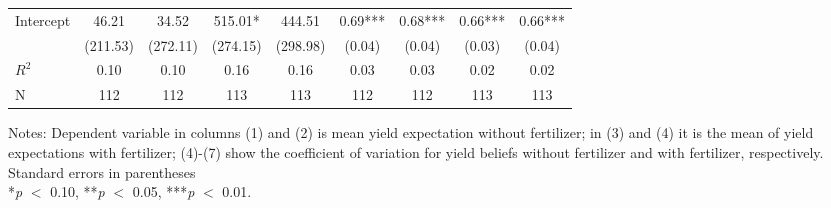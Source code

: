 \begin{table}[htbp]
\begin{threeparttable}
\begin{tabular}{l cccccccc}
Intercept           &       46.21   &       34.52   &      515.01*  &      444.51   &        0.69***&        0.68***&        0.66***&        0.66***\\
                    &    (211.53)   &    (272.11)   &    (274.15)   &    (298.98)   &      (0.04)   &      (0.04)   &      (0.03)   &      (0.04)   \\
\hline
$R^2$               &        0.10   &        0.10   &        0.16   &        0.16   &        0.03   &        0.03   &        0.02   &        0.02   \\
N                   &         112   &         112   &         113   &         113   &         112   &         112   &         113   &         113   \\
\hline
\hline
\end{tabular}
\begin{tablenotes}
\footnotesize
\item{Notes: Dependent variable in columns (1) and (2) is mean yield expectation without fertilizer; in (3) and (4) it is the mean of yield expectations with fertilizer; (4)-(7) show the coefficient of variation for yield beliefs without fertilizer and with fertilizer, respectively. \\ Standard errors in parentheses \\ *\textit{p} $<$ 0.10, **\textit{p} $<$ 0.05, ***\textit{p} $<$ 0.01.}
\end{tablenotes}
\end{threeparttable}
\end{table}
